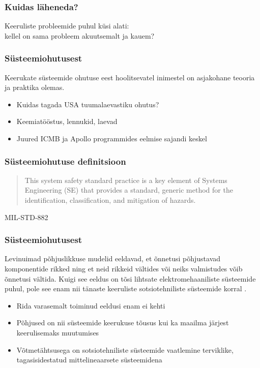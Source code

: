 \fi

\begin{frame}[fragile]
	\frametitle{Kuidas läheneda?}
	\vfill
	\begin{center}
		Keeruliste probleemide puhul küsi alati: \\kellel on sama probleem akuutsemalt ja kauem?  
	\end{center}
	\vfill
\end{frame}

\begin{frame}[fragile]
  \frametitle{Süsteemiohutusest}
	Keerukate süsteemide ohutuse eest hoolitsevatel inimestel on asjakohane teooria ja praktika olemas.
	\begin{itemize}
		\item Kuidas tagada USA tuumalaevastiku ohutus?
		\item Keemiatööstus, lennukid, laevad 
		\item Juured ICMB ja Apollo programmides eelmise sajandi keskel
	\end{itemize}
\end{frame}

\begin{frame}[fragile]
  \frametitle{Süsteemiohutuse definitsioon}
	\begin{center}
		\begin{quote}
			This system safety standard practice is a key element of Systems Engineering (SE) that provides a standard, generic method for the identification, classification, and mitigation of hazards.
		\end{quote}
	\end{center}
			MIL-STD-882
	
\end{frame}

\begin{frame}[fragile]
  \frametitle{Süsteemiohutusest}
	Levinuimad põhjuslikkuse mudelid eeldavad, et õnnetusi põhjustavad komponentide rikked ning et neid rikkeid vältides või neiks valmistudes võib õnnetusi vältida. Kuigi see eeldus on tõsi lihtsate elektromehaaniliste süsteemide puhul, pole see enam nii tänaste keeruliste sotsiotehniliste süsteemide korral \cite{leveson2011engineering}.
	\begin{itemize}
		\item Rida varasemalt toiminud eeldusi enam ei kehti
		\item Põhjused on nii süsteemide keerukuse tõusus kui ka maailma järjest keerulisemaks muutumises
		\item Võtmetähtsusega on sotsiotehniliste süsteemide vaatlemine terviklike, tagasisidestatud mittelineaarsete süsteemidena
	\end{itemize}
\end{frame}


